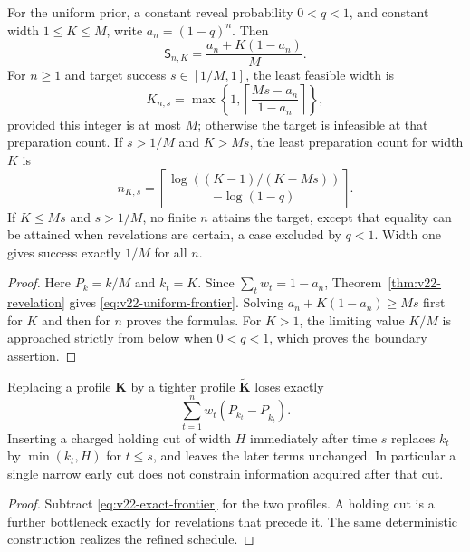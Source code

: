 \begin{corollary}
\label{cor:v22-erasure-tradeoff}
For the uniform prior, a constant reveal probability $0<q<1$, and
constant width $1\le K\le M$, write $a_n=(1-q)^n$. Then
\begin{equation}\label{eq:v22-uniform-frontier}
 \mathsf S_{n,K}=\frac{a_n+K(1-a_n)}M.
\end{equation}
For $n\ge1$ and target success $s\in[1/M,1]$, the least feasible
width is
\begin{equation}\label{eq:v22-width-inverse}
 K_{n,s}=\max\left\{1,
       \left\lceil\frac{Ms-a_n}{1-a_n}\right\rceil\right\},
\end{equation}
provided this integer is at most $M$; otherwise the target is
infeasible at that preparation count. If $s>1/M$ and $K>Ms$, the
least preparation count for width $K$ is
\begin{equation}\label{eq:v22-samples-inverse}
 n_{K,s}=\left\lceil
 \frac{\log((K-1)/(K-Ms))}{-\log(1-q)}\right\rceil.
\end{equation}
If $K\le Ms$ and $s>1/M$, no finite $n$ attains the target, except
that equality can be attained when revelations are certain, a case
excluded by $q<1$. Width one gives success exactly $1/M$ for all $n$.
\end{corollary}
\begin{proof}
Here $P_k=k/M$ and $k_t=K$. Since $\sum_tw_t=1-a_n$,
Theorem~\ref{thm:v22-revelation} gives \eqref{eq:v22-uniform-frontier}.
Solving $a_n+K(1-a_n)\ge Ms$ first for $K$ and then for $n$ proves the
formulas. For $K>1$, the limiting value $K/M$ is approached strictly
from below when $0<q<1$, which proves the boundary assertion.
\end{proof}

\begin{corollary}
\label{cor:v22-cut-sensitivity}
Replacing a profile $\boldsymbol K$ by a tighter profile
$\widetilde{\boldsymbol K}$ loses exactly
\[
 \sum_{t=1}^n w_t(P_{k_t}-P_{\widetilde k_t}).
\]
Inserting a charged holding cut of width $H$ immediately after time
$s$ replaces $k_t$ by $\min(k_t,H)$ for $t\le s$, and leaves the
later terms unchanged. In particular a single narrow early cut does
not constrain information acquired after that cut.
\end{corollary}
\begin{proof}
Subtract \eqref{eq:v22-exact-frontier} for the two profiles. A holding
cut is a further bottleneck exactly for revelations that precede it.
The same deterministic construction realizes the refined schedule.
\end{proof}

